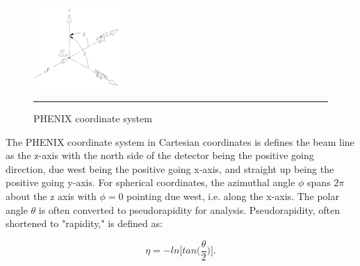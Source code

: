 \appendix

\begin{figure}[htbp!]
  \centering
    \includegraphics[width=0.3\textwidth]{Figures/coord2.jpg}
    \rule{35em}{0.5pt}
  \caption[PHENIX coordinate system]{PHENIX coordinate system}
  \label{fig:PHENIXcoord}
\end{figure}

The PHENIX coordinate system in Cartesian coordinates is defines the beam line as the z-axis with the north side of the detector being the positive going direction, due west being the positive going x-axis, and straight up being the positive going y-axis. For spherical coordinates, the azimuthal angle $\phi$ spans $2\pi$ about the z axis with $\phi=0$ pointing due west, i.e. along the x-axis. The polar angle $\theta$ is often converted to pseudorapidity for analysis. Pseudorapidity, often shortened to "rapidity," is defined as:

\begin{equation}
\eta = - ln \bigg[ tan \bigg( \frac{\theta}{2} \bigg) \bigg].
\end{equation}

